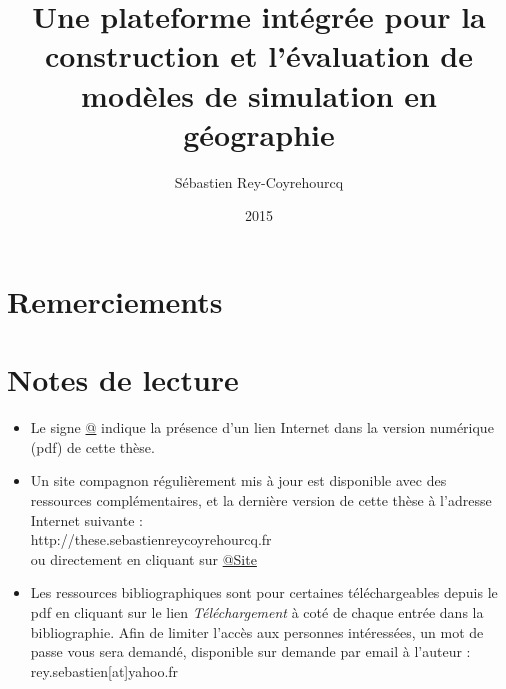 \documentclass[a4paper, 11pt, openany, openright]{memoir}
\title{Une plateforme intégrée pour la construction et l'évaluation de modèles de simulation en géographie}
\author{Sébastien Rey-Coyrehourcq}
\date{2015}
\makeatletter
\newcommand{\FrameTitle}[2]{%
\fboxrule=\FrameRule \fboxsep=\FrameSep
\fbox{\vbox{\nobreak \vskip -0.7\FrameSep
\rlap{\strut#1}\nobreak\nointerlineskip%
\vskip 0.7\FrameSep
\hbox{#2}}}}
\newenvironment{framewithtitle}[2][\FrameFirst@Lab\ (cont.)]{%
\def\FrameFirst@Lab{\textbf{#2}}%
\def\FrameCont@Lab{\textbf{#1}}%
\def\FrameCommand##1{%
\FrameTitle{\FrameFirst@Lab}{##1}}%
\def\FirstFrameCommand##1{%
\FrameTitle{\FrameFirst@Lab}{##1}}%
\def\MidFrameCommand##1{%
\FrameTitle{\FrameCont@Lab}{##1}}%
\def\LastFrameCommand##1{%
\FrameTitle{\FrameCont@Lab}{##1}}%
\MakeFramed{\advance\hsize-\width \FrameRestore}}%
{\endMakeFramed}
\def@{\color{Black}\svat\tilblank}
\makeatother
\begin{document}
\begin{titlingpage}
  \maketitle
\end{titlingpage}

\frontmatter

\cleardoublepage
{}
{}
\chapter*{Remerciements}



\cleardoublepage

{}
\chapter*{Notes de lecture}

\begin{framewithtitle}{}{}
\begin{itemize}
  \item Le signe \href{http://www.google.fr}{@} indique la présence d'un lien Internet dans la version numérique (pdf) de cette thèse.

  \item Un site compagnon régulièrement mis à jour est disponible avec des ressources complémentaires, et la dernière version de cette thèse à l'adresse Internet suivante : 
  \\ http://these.sebastienreycoyrehourcq.fr 
  \\ ou directement en cliquant sur \href{http://these.sebastienreycoyrehourcq.fr}{@Site}

  \item Les ressources bibliographiques sont pour certaines téléchargeables depuis le pdf en cliquant sur le lien \textit{Téléchargement} à coté de chaque entrée dans la bibliographie. Afin de limiter l'accès aux personnes intéressées, un mot de passe vous sera demandé, disponible sur demande par email à l'auteur : \\ rey.sebastien[at]yahoo.fr
\end{itemize}

\end{framewithtitle}

\cleardoublepage




\tableofcontents

\mainmatter











\listoftables

\listoffigures




\printbibliography
\end{document}
